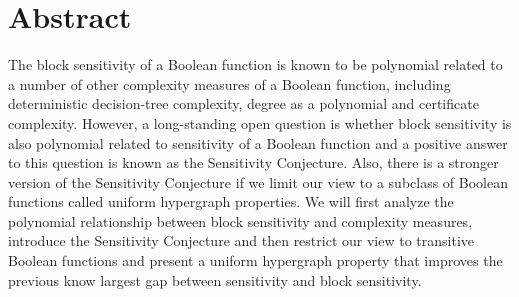 \documentclass[psamsfonts]{amsart}
\theoremstyle{definition}
\theoremstyle{remark}
\numberwithin{equation}{section}
\begin{document}
	\section{Abstract}
		The block sensitivity of a Boolean function is known to be polynomial related to a number of other complexity measures of a Boolean function, including deterministic decision-tree complexity, degree as a polynomial and certificate complexity. However, a long-standing open question is whether block sensitivity is also polynomial related to sensitivity of a Boolean function and a positive answer to this question is known as the Sensitivity Conjecture.  Also, there is a stronger version of the Sensitivity Conjecture if we limit our view to a subclass of Boolean functions called uniform hypergraph properties. We will first analyze the polynomial relationship between block sensitivity and complexity measures, introduce the Sensitivity Conjecture and then restrict our view to transitive Boolean functions and present a uniform hypergraph property that improves the previous know largest gap between sensitivity and block sensitivity.
\end{document}
